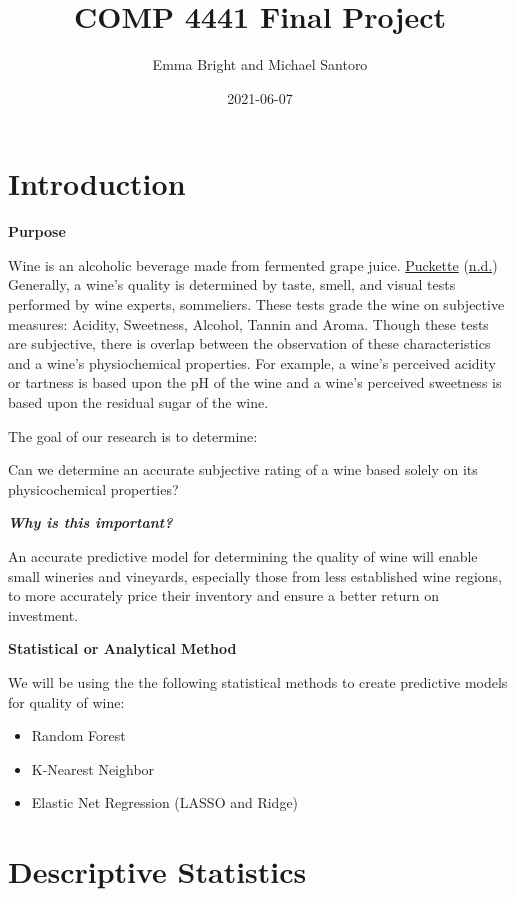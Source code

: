 \documentclass[
]{book}
\title{COMP 4441 Final Project}
\author{Emma Bright and Michael Santoro}
\date{2021-06-07}
\providecommand{\tightlist}{%
  \setlength{\itemsep}{0pt}\setlength{\parskip}{0pt}}
\begin{document}
\maketitle

{
\setcounter{tocdepth}{1}
\tableofcontents
}
\hypertarget{introduction}{%
\chapter{Introduction}\label{introduction}}

\textbf{Purpose}

Wine is an alcoholic beverage made from fermented grape juice. \protect\hyperlink{ref-wine_exactly_web}{Puckette} (\protect\hyperlink{ref-wine_exactly_web}{n.d.}) Generally, a wine's quality is determined by taste, smell, and visual tests performed by wine experts, sommeliers. These tests grade the wine on subjective measures: Acidity, Sweetness, Alcohol, Tannin and Aroma. Though these tests are subjective, there is overlap between the observation of these characteristics and a wine's physiochemical properties. For example, a wine's perceived acidity or tartness is based upon the pH of the wine and a wine's perceived sweetness is based upon the residual sugar of the wine.

The goal of our research is to determine:

Can we determine an accurate subjective rating of a wine based solely on its physicochemical properties?

\textbf{\emph{Why is this important?}}

An accurate predictive model for determining the quality of wine will enable small wineries and vineyards, especially those from less established wine regions, to more accurately price their inventory and ensure a better return on investment.

\textbf{Statistical or Analytical Method}

We will be using the the following statistical methods to create predictive models for quality of wine:

\begin{itemize}
\tightlist
\item
  Random Forest
\item
  K-Nearest Neighbor
\item
  Elastic Net Regression (LASSO and Ridge)
\end{itemize}

\hypertarget{descriptive-statistics}{%
\chapter{Descriptive Statistics}\label{descriptive-statistics}}
\end{document}
